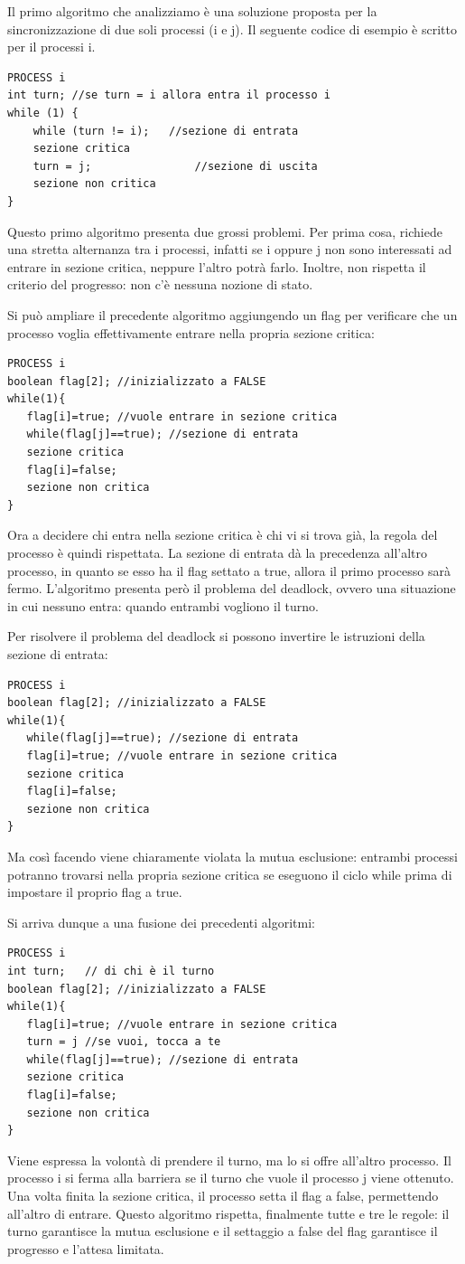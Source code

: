 \documentclass[a4paper]{article}
\begin{document}
Il primo algoritmo che analizziamo è una soluzione proposta per la sincronizzazione di due soli processi (i e j). Il seguente codice di esempio è scritto per il processi i.
\begin{verbatim}
PROCESS i
int turn; //se turn = i allora entra il processo i
while (1) {
    while (turn != i);   //sezione di entrata
    sezione critica
    turn = j;                //sezione di uscita
    sezione non critica
}
\end{verbatim}
Questo primo algoritmo presenta due grossi problemi. Per prima cosa, richiede una stretta alternanza tra i processi, infatti se i oppure j non sono interessati ad entrare in sezione critica, neppure l'altro potrà farlo. Inoltre, non rispetta il criterio del progresso: non c'è nessuna nozione di stato.

Si può ampliare il precedente algoritmo aggiungendo un flag per verificare che un processo voglia effettivamente entrare nella propria sezione critica:
\begin{verbatim}
PROCESS i
boolean flag[2]; //inizializzato a FALSE
while(1){
   flag[i]=true; //vuole entrare in sezione critica
   while(flag[j]==true); //sezione di entrata
   sezione critica
   flag[i]=false;
   sezione non critica
}
\end{verbatim}
Ora a decidere chi entra nella sezione critica è chi vi si trova già, la regola del processo è quindi rispettata. La sezione di entrata dà la precedenza all'altro processo, in quanto se esso ha il flag settato a true, allora il primo processo sarà fermo. L'algoritmo presenta però il problema del deadlock, ovvero una situazione in cui nessuno entra: quando entrambi vogliono il turno.

Per risolvere il problema del deadlock si possono invertire le istruzioni della sezione di entrata:
\begin{verbatim}
PROCESS i
boolean flag[2]; //inizializzato a FALSE
while(1){
   while(flag[j]==true); //sezione di entrata
   flag[i]=true; //vuole entrare in sezione critica
   sezione critica
   flag[i]=false;
   sezione non critica
}
\end{verbatim}
Ma così facendo viene chiaramente violata la mutua esclusione: entrambi processi potranno trovarsi nella propria sezione critica se eseguono il ciclo while prima di impostare il proprio flag a true.

Si arriva dunque a una fusione dei precedenti algoritmi:
\begin{verbatim}
PROCESS i
int turn;   // di chi è il turno
boolean flag[2]; //inizializzato a FALSE
while(1){
   flag[i]=true; //vuole entrare in sezione critica
   turn = j //se vuoi, tocca a te
   while(flag[j]==true); //sezione di entrata
   sezione critica
   flag[i]=false;
   sezione non critica
}
\end{verbatim}
Viene espressa la volontà di prendere il turno, ma lo si offre all'altro processo. Il processo i si ferma alla barriera se il turno che vuole il processo j viene ottenuto. Una volta finita la sezione critica, il processo setta il flag a false, permettendo all'altro di entrare. Questo algoritmo rispetta, finalmente tutte e tre le regole: il turno garantisce la mutua esclusione e il settaggio a false del flag garantisce il progresso e l'attesa limitata.
\end{document}
